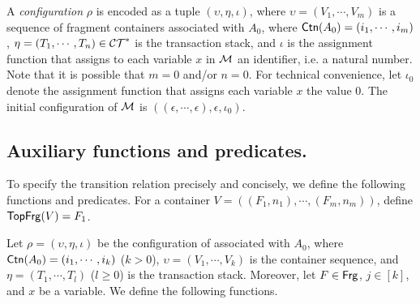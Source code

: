 %
A \emph{configuration} $\rho$ %
is encoded as a tuple $(\upsilon, \eta, \iota)$, where %
$\upsilon = (V_1, \cdots, V_m)$  is a sequence of fragment containers associated with $A_0$, where ${\sf Ctn}(A_0) = (i_1,\cdots,i_m)$, $\eta= (T_1, \cdots, T_n) \in \mathcal{CT}^*$ is the transaction stack, and $\iota$ is the assignment function that assigns to each variable $x$ in ${\mathcal{M} }$ an identifier, i.e. a natural number. Note that it is possible that $m=0$ and/or $n=0$. For technical convenience, let $\iota_0$ denote the assignment function that assigns each variable $x$ the value $0$. The initial configuration of ${\mathcal{M} }$ is $((\epsilon,\cdots,\epsilon),\epsilon,\iota_0)$.

\subsection*{Auxiliary functions and predicates.} To specify the transition relation precisely and concisely, we define the following functions and predicates. 
For a container $V=((F_1, n_1), \cdots, (F_{m}, n_m))$, define ${\sf TopFrg}(V) = F_1$.

Let $\rho = (\upsilon, \eta, \iota)$ be the configuration of associated with $A_0$, where ${\sf Ctn}(A_0) = (i_1, \cdots, i_k)$  ($k > 0$), $\upsilon = (V_1, \cdots, V_k)$ is the container sequence, and $\eta = (T_1, \cdots, T_l)$ ($l \ge 0$) is the transaction stack. Moreover, let $F \in {\sf Frg}$, $j \in [k]$, and $x$ be a variable. 
We define the following functions.

